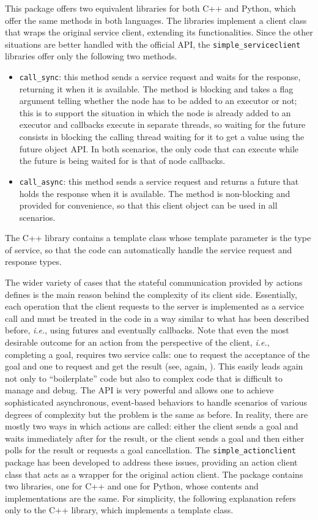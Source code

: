This package offers two equivalent libraries for both C++ and Python, which offer the same methods in both languages. The libraries implement a client class that wraps the original \ROS service client, extending its functionalities. Since the other situations are better handled with the official \ROS API, the \texttt{simple\_serviceclient} libraries offer only the following two methods.
\begin{itemize}
  \item \texttt{call\_sync}: this method sends a service request and waits for the response, returning it when it is available. The method is blocking and takes a flag argument telling whether the node has to be added to an executor or not; this is to support the situation in which the node is already added to an executor and callbacks execute in separate threads, so waiting for the future consists in blocking the calling thread waiting for it to get a value using the future object API. In both scenarios, the only code that can execute while the future is being waited for is that of node callbacks.
  \item \texttt{call\_async}: this method sends a service request and returns a future that holds the response when it is available. The method is non-blocking and provided for convenience, so that this client object can be used in all scenarios.
\end{itemize}
The C++ library contains a template class whose template parameter is the type of service, so that the code can automatically handle the service request and response types.

The wider variety of cases that the stateful communication provided by actions defines is the main reason behind the complexity of its client side. Essentially, each operation that the client requests to the server is implemented as a service call and must be treated in the code in a way similar to what has been described before, \emph{i.e.}, using futures and eventually callbacks. Note that even the most desirable outcome for an action from the perspective of the client, \emph{i.e.}, completing a goal, requires two service calls: one to request the acceptance of the goal and one to request and get the result (see, again, ). This easily leads again not only to ``boilerplate'' code but also to complex code that is difficult to manage and debug. The API is very powerful and allows one to achieve sophisticated asynchronous, event-based behaviors to handle scenarios of various degrees of complexity but the problem is the same as before. In reality, there are mostly two ways in which actions are called: either the client sends a goal and waits immediately after for the result, or the client sends a goal and then either polls for the result or requests a goal cancellation. The \texttt{simple\_actionclient} package \cite{masocco_simple_actionclient_nodate} has been developed to address these issues, providing an action client class that acts as a wrapper for the original action client. The package contains two libraries, one for C++ and one for Python, whose contents and implementations are the same. For simplicity, the following explanation refers only to the C++ library, which implements a template class.

